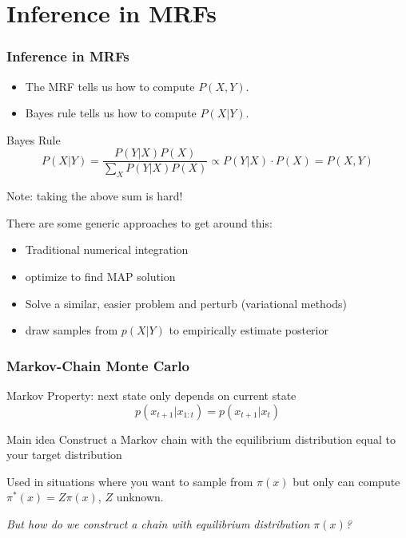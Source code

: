 \documentclass[compress]{beamer}
\begin{document}
\section{Inference in MRFs}
\frame{\tableofcontents[currentsection]}

\begin{frame}
  \frametitle{Inference in MRFs}
  \begin{itemize}
  \item The MRF tells us how to compute $P(X, Y)$.
  \item Bayes rule  tells us how to compute $P(X | Y)$.
  \end{itemize}
  
  \begin{block}{Bayes Rule} 
    \begin{equation*}
      P(X | Y ) = \frac{P(Y | X) P(X)}{\sum_XP(Y|X)P(X)} \propto P(Y | X) \cdot  P(X) = P(X, Y)
    \end{equation*}
  \end{block}

  \pause
  Note: taking the above sum is hard! 
  
  There are some generic approaches to get around this: 
  \begin{itemize}[<+->]
  \item Traditional numerical integration
  \item optimize to find MAP solution
  \item Solve a similar, easier problem and perturb (variational methods)
  \item draw samples from $p(X | Y)$ to empirically estimate posterior
  \end{itemize}
  
\end{frame}

\begin{frame}
  \frametitle{Markov-Chain Monte Carlo}
  Markov Property: next state only depends on current state
  \begin{equation*}
    p(x_{t+1} | x_{1:t}) = p(x_{t+1} | x_{t})
  \end{equation*}
  
  \begin{block}{Main idea}
    Construct a Markov chain with the equilibrium distribution equal to your target distribution
  \end{block}
  Used in situations where you want to sample from
  $\pi(x)$ but only can compute $\pi^\ast(x) = Z \pi(x)$, $Z$ unknown. 

  \textit{But how do we construct a chain with equilibrium distribution $\pi(x)$?}
\end{frame}
\end{document}
